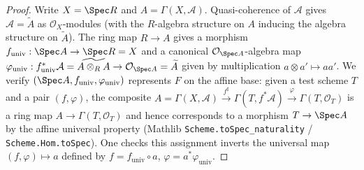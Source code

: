 \begin{proof}
  
  Write \(X = \Spec R\) and \(A = \Gamma(X, \mathcal{A})\). Quasi-coherence of
  \(\mathcal{A}\) gives \(\mathcal{A} = \widetilde{A}\) as \(\mathcal{O}_X\)-modules
  (with the \(R\)-algebra structure on \(A\) inducing the algebra structure on
  \(\widetilde A\)). The ring map \(R \to A\) gives a morphism
  \(f_{\mathrm{univ}} : \Spec A \to \Spec R = X\) and a canonical
  \(\mathcal{O}_{\Spec A}\)-algebra map
  $\varphi_{\mathrm{univ}} : f_{\mathrm{univ}}^* \mathcal{A} = \widetilde{A \otimes_R A}
  \to \mathcal{O}_{\Spec A} = \widetilde A$ given by multiplication
  \(a \otimes a' \mapsto aa'\). We verify \((\Spec A, f_{\mathrm{univ}}, \varphi_{\mathrm{univ}})\)
  represents \(F\) on the affine base: given a test scheme \(T\) and a pair
  \((f, \varphi)\), the composite
  $A = \Gamma(X, \mathcal{A}) \xrightarrow{f^\sharp}
  \Gamma(T, f^*\mathcal{A}) \xrightarrow{\varphi} \Gamma(T, \mathcal{O}_T)$
  is a ring map \(A \to \Gamma(T, \mathcal{O}_T)\) and hence corresponds to a morphism
  \(T \to \Spec A\) by the affine universal property
  (Mathlib \texttt{Scheme.toSpec\_naturality} /
  \texttt{Scheme.Hom.toSpec}). One checks this assignment inverts the universal map
  \((f, \varphi) \mapsto a\) defined by \(f = f_{\mathrm{univ}} \circ a\),
  \(\varphi = a^* \varphi_{\mathrm{univ}}\).
\end{proof}

